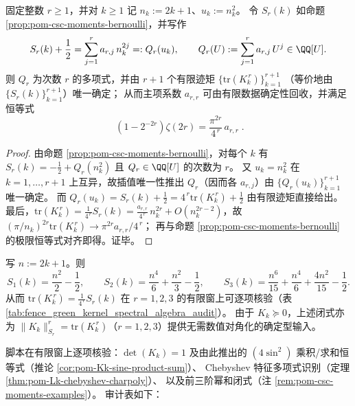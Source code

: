 \begin{corollary}\label{cor:pom-csc-moments-finite-trace-inversion}
固定整数 \(r\ge 1\)，并对 \(k\ge 1\) 记 \(n_k:=2k+1\)、\(u_k:=n_k^2\)。
令 \(S_r(k)\) 如命题 \ref{prop:pom-csc-moments-bernoulli}，并写作
\[
S_r(k)+\frac12=\sum_{j=1}^{r}a_{r,j}\,n_k^{2j}=:Q_r(u_k),
\qquad
Q_r(U):=\sum_{j=1}^{r}a_{r,j}\,U^{j}\in\QQ[U].
\]
则 \(Q_r\) 为次数 \(r\) 的多项式，并由 \(r+1\) 个有限迹矩
\(
\{\mathrm{tr}(K_k^{\,r})\}_{k=1}^{r+1}
\)
（等价地由 \(\{S_r(k)\}_{k=1}^{r+1}\)）唯一确定；
从而主项系数 \(a_{r,r}\) 可由有限数据确定性回收，并满足恒等式
\[
\boxed{\;
(1-2^{-2r})\zeta(2r)=\frac{\pi^{2r}}{4^{\,r}}\,a_{r,r}\; }.
\]
\end{corollary}
\begin{proof}
由命题 \ref{prop:pom-csc-moments-bernoulli}，对每个 \(k\) 有 \(S_r(k)=-\frac12+Q_r(n_k^2)\) 且 \(Q_r\in\QQ[U]\) 的次数为 \(r\)。
又 \(u_k=n_k^2\) 在 \(k=1,\dots,r+1\) 上互异，故插值唯一性推出 \(Q_r\)（因而各 \(a_{r,j}\)）由 \(\{Q_r(u_k)\}_{k=1}^{r+1}\) 唯一确定。
而 \(Q_r(u_k)=S_r(k)+\frac12=4^{\,r}\mathrm{tr}(K_k^{\,r})+\frac12\) 由有限迹矩直接给出。
最后，\(\mathrm{tr}(K_k^{\,r})=\frac{1}{4^{\,r}}S_r(k)=\frac{a_{r,r}}{4^{\,r}}\,n_k^{2r}+O(n_k^{2r-2})\)，故
\(
(\pi/n_k)^{2r}\mathrm{tr}(K_k^{\,r})\to \pi^{2r}a_{r,r}/4^{\,r}
\)；
再与命题 \ref{prop:pom-csc-moments-bernoulli} 的极限恒等式对齐即得。证毕。
\end{proof}

\begin{remark}\label{rem:pom-csc-moments-examples}
写 \(n:=2k+1\)。则
\[
S_1(k)=\frac{n^2}{2}-\frac12,\qquad
S_2(k)=\frac{n^4}{6}+\frac{n^2}{3}-\frac12,\qquad
S_3(k)=\frac{n^6}{15}+\frac{n^4}{6}+\frac{4n^2}{15}-\frac12.
\]
从而 \(\mathrm{tr}(K_k^{\,r})=\frac{1}{4^{\,r}}S_r(k)\) 在 \(r=1,2,3\) 的有限窗上可逐项核验（表 \ref{tab:fence_green_kernel_spectral_algebra_audit}）。
由于 \(K_k\succeq 0\)，上述闭式亦为 \(\|K_k\|_{S_r}^r=\mathrm{tr}(K_k^{\,r})\)（\(r=1,2,3\)）提供无需数值对角化的确定型输入。
\end{remark}

\begin{remark}\label{rem:pom-fence-green-kernel-spectral-algebra-audit}
脚本在有限窗上逐项核验：\(\det(K_k)=1\) 及由此推出的 \((4\sin^2)\) 乘积/求和恒等式（推论 \ref{cor:pom-Kk-sine-product-sum}）、
Chebyshev 特征多项式识别（定理 \ref{thm:pom-Lk-chebyshev-charpoly}）、
以及前三阶幂和闭式（注 \ref{rem:pom-csc-moments-examples}）。
审计表如下：

\end{remark}

